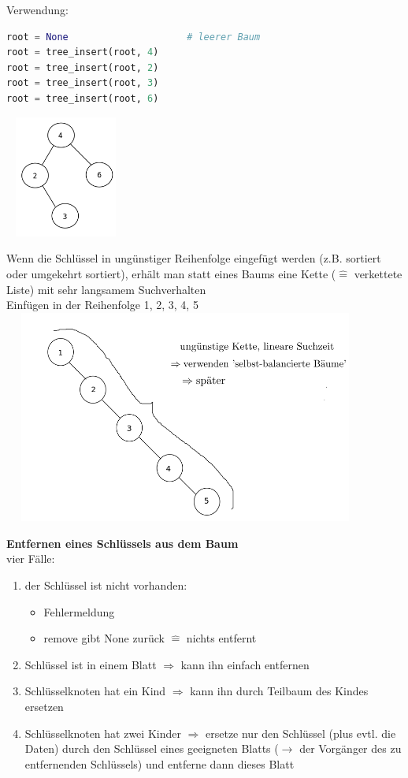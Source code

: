 \documentclass[11pt, fleqn]{scrreprt}
\begin{document}
Verwendung:
\begin{lstlisting}[language=Python]
root = None						# leerer Baum
root = tree_insert(root, 4)
root = tree_insert(root, 2)
root = tree_insert(root, 3)
root = tree_insert(root, 6)
\end{lstlisting}

\includegraphics[width=4cm,height=4cm,keepaspectratio]{./Pictures/zahlenbaum.png}

Wenn die Schlüssel in ungünstiger Reihenfolge eingefügt werden (z.B. sortiert oder umgekehrt sortiert), erhält man statt eines Baums eine Kette ($\widehat{=}$ verkettete Liste) mit sehr langsamem Suchverhalten \\

Einfügen in der Reihenfolge 1, 2, 3, 4, 5 \\

\includegraphics[width=12cm,height=7cm,keepaspectratio]{./Pictures/Kette.png}

\textbf{Entfernen eines Schlüssels aus dem Baum}\\
vier Fälle:
\begin{enumerate}
	\item der Schlüssel ist nicht vorhanden:
	\begin{itemize}
		\item Fehlermeldung
		\item remove gibt None zurück $\widehat{=}$ nichts entfernt
	\end{itemize}
	\item Schlüssel ist in einem Blatt $\Rightarrow$ kann ihn einfach entfernen
	\item Schlüsselknoten hat ein Kind $\Rightarrow$ kann ihn durch Teilbaum des Kindes ersetzen
	\item Schlüsselknoten hat zwei Kinder $\Rightarrow$ ersetze nur den Schlüssel (plus evtl. die Daten) durch den Schlüssel eines geeigneten Blatts ($\rightarrow$ der Vorgänger des zu entfernenden Schlüssels)  und entferne dann dieses Blatt
\end{enumerate}
\end{document}
